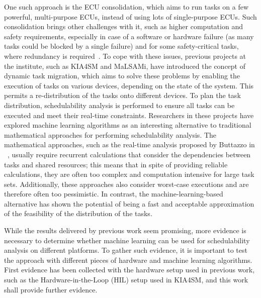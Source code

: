 One such approach is the ECU consolidation, which aims to run tasks on a few powerful, multi-purpose ECUs, instead of using lots of single-purpose ECUs. Such consolidation brings other challenges with it, such as higher computation and safety requirements, especially in case of a software or hardware failure (as many tasks could be blocked by a single failure) and for some safety-critical tasks, where redundancy is required~\parencite{mundhenk1}. To cope with these issues, previous projects at the institute, such as KIA4SM and MaLSAMi, have introduced the concept of dynamic task migration, which aims to solve these problems by enabling the execution of tasks on various devices, depending on the state of the system. This permits a re-distribution of the tasks onto different devices. To plan the task distribution, schedulability analysis is performed to ensure all tasks can be executed and meet their real-time constraints. Researchers in these projects have explored machine learning algorithms as an interesting alternative to traditional mathematical approaches for performing schedulability analysis. The mathematical approaches, such as the real-time analysis proposed by Buttazzo in ~\parencite{buttazzo1}, usually require recurrent calculations that consider the dependencies between tasks and shared resources; this means that in spite of providing reliable calculations, they are often too complex and computation intensive for large task sets. Additionally, these approaches also consider worst-case executions and are therefore often too pessimistic. In contrast, the machine-learning-based alternative has shown the potential of being a fast and acceptable approximation of the feasibility of the distribution of the tasks. 

While the results delivered by previous work seem promising, more evidence is necessary to determine whether machine learning can be used for schedulability analysis on different platforms. To gather such evidence, it is important to test the approach with different pieces of hardware and machine learning algorithms. First evidence has been collected with the hardware setup used in previous work, such as the Hardware-in-the-Loop (HIL) setup used in KIA4SM, and this work shall provide further evidence.

